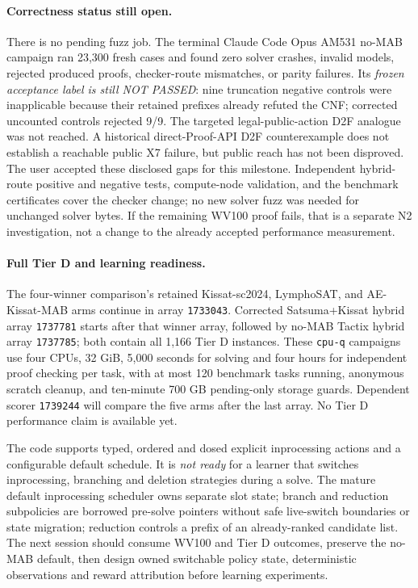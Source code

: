 \documentclass[11pt]{article}
\begin{document}
\paragraph{Correctness status still open.}
There is no pending fuzz job. The terminal Claude Code Opus AM531 no-MAB campaign ran 23,300 fresh cases and found zero solver crashes, invalid models, rejected produced proofs, checker-route mismatches, or parity failures. Its \emph{frozen acceptance label is still NOT PASSED}: nine truncation negative controls were inapplicable because their retained prefixes already refuted the CNF; corrected uncounted controls rejected 9/9. The targeted legal-public-action D2F analogue was not reached. A historical direct-Proof-API D2F counterexample does not establish a reachable public X7 failure, but public reach has not been disproved. The user accepted these disclosed gaps for this milestone. Independent hybrid-route positive and negative tests, compute-node validation, and the benchmark certificates cover the checker change; no new solver fuzz was needed for unchanged solver bytes. If the remaining WV100 proof fails, that is a separate N2 investigation, not a change to the already accepted performance measurement.

\paragraph{Full Tier D and learning readiness.}
The four-winner comparison's retained Kissat-sc2024, LymphoSAT, and AE-Kissat-MAB arms continue in array \texttt{1733043}. Corrected Satsuma+Kissat hybrid array \texttt{1737781} starts after that winner array, followed by no-MAB Tactix hybrid array \texttt{1737785}; both contain all 1,166 Tier D instances. These \texttt{cpu-q} campaigns use four CPUs, 32 GiB, 5,000 seconds for solving and four hours for independent proof checking per task, with at most 120 benchmark tasks running, anonymous scratch cleanup, and ten-minute 700 GB pending-only storage guards. Dependent scorer \texttt{1739244} will compare the five arms after the last array. No Tier D performance claim is available yet.

The code supports typed, ordered and dosed explicit inprocessing actions and a configurable default schedule. It is \emph{not ready} for a learner that switches inprocessing, branching and deletion strategies during a solve. The mature default inprocessing scheduler owns separate slot state; branch and reduction subpolicies are borrowed pre-solve pointers without safe live-switch boundaries or state migration; reduction controls a prefix of an already-ranked candidate list. The next session should consume WV100 and Tier D outcomes, preserve the no-MAB default, then design owned switchable policy state, deterministic observations and reward attribution before learning experiments.
\end{document}
